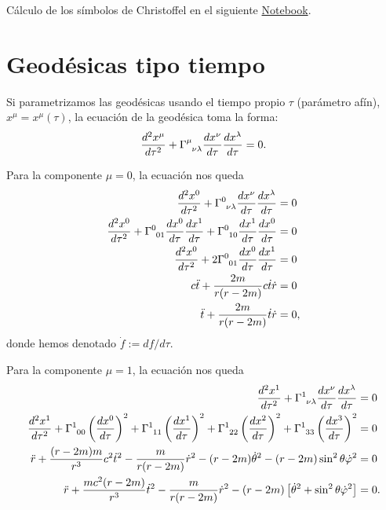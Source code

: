 \documentclass[letterpaper,11pt]{article}
\begin{document}
Cálculo de los símbolos de Christoffel en el siguiente \href{https://github.com/AleSaa66/Topicos-RG/blob/main/Semana%202/Semana-2.ipynb}{Notebook}.

\section{Geodésicas tipo tiempo} 

Si parametrizamos las geodésicas usando el tiempo propio $\tau$ (parámetro afín), $x^{\mu} = x^{\mu}(\tau)$, la ecuación de la geodésica toma la forma:
\begin{equation}
    \frac{d^2 x^{\mu}}{d\tau^2} + \Gamma\indices{^\mu_{\nu \lambda}} \frac{dx^{\nu}}{d\tau} \frac{dx^{\lambda}}{d\tau} = 0.
\end{equation}

Para la componente $\mu = 0$, la ecuación nos queda
\begin{align}
\frac{d^2 x^{0}}{d\tau^2} + \Gamma\indices{^0_{\nu \lambda}} \frac{dx^{\nu}}{d\tau} \frac{dx^{\lambda}}{d\tau} &= 0 \\
\frac{d^2 x^{0}}{d\tau^2} +  \Gamma\indices{^0_{01}} \frac{dx^{0}}{d\tau} \frac{dx^1}{d\tau} +  \Gamma\indices{^0_{10}} \frac{dx^{1}}{d\tau} \frac{dx^0}{d\tau} &= 0 \\
\frac{d^2 x^{0}}{d\tau^2} +  2 \Gamma\indices{^0_{01}} \frac{dx^{0}}{d\tau} \frac{dx^1}{d\tau}  &= 0  \\
c \Ddot{t} +  \frac{2m}{r(r-2m)} c\dot{t} \dot{r}&= 0 \\
\Ddot{t} +  \frac{2m}{r(r-2m)} \dot{t} \dot{r}&= 0,
\end{align}
donde hemos denotado $\dot{f} := df/d\tau$.

Para la componente $\mu = 1$, la ecuación nos queda
\begin{align}
\frac{d^2 x^{1}}{d\tau^2} + \Gamma\indices{^1_{\nu \lambda}} \frac{dx^{\nu}}{d\tau} \frac{dx^{\lambda}}{d\tau} &= 0 \\
    \frac{d^2 x^{1}}{d\tau^2} +  \Gamma\indices{^1_{00}} \left( \frac{dx^{0}}{d\tau} \right)^2 +  \Gamma\indices{^1_{11}} \left( \frac{dx^{1}}{d\tau} \right)^2 + \Gamma\indices{^1_{22}} \left( \frac{dx^2}{d\tau}\right)^2 +  \Gamma\indices{^1_{33}} \left( \frac{dx^{3}}{d\tau} \right)^2 &= 0 \\
\Ddot{r} + \frac{(r-2m)m}{r^3} c^2 \dot{t}^2 - \frac{m}{r(r-2m)} \dot{r}^2 - (r-2m) \dot{\theta}^2 - (r-2m) \sin^2\theta \dot{\varphi}^2 &= 0 \\
\Ddot{r} + \frac{mc^2(r-2m)}{r^3} \dot{t}^2 - \frac{m}{r(r-2m)} \dot{r}^2 - (r-2m) \left[\dot{\theta}^2 + \sin^2\theta \dot{\varphi}^2 \right]  &= 0.
\end{align}
\end{document}
